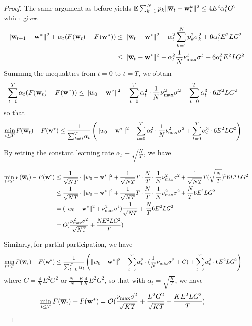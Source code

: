 \begin{proof}
	The same argument as before yields $\mathbb{E}\sum_{k=1}^{N}p_{k}\|{\overline{\mathbf{w}}}_{t}-{\mathbf{w}}_{t}^{k}\|^{2}\leq4E^{2}\alpha_{t}^{2}G^{2}$
	which gives 
	\begin{align*}
	\|{\overline{\mathbf{w}}}_{t+1}-{\mathbf{w}}^{\ast}\|^{2}+\alpha_{t}(F({\overline{\mathbf{w}}}_{t})-F({\mathbf{w}}^{\ast})) & \leq\|{\overline{\mathbf{w}}}_{t}-{\mathbf{w}}^{\ast}\|^{2}+\alpha_{t}^{2}\sum_{k=1}^{N}p_{k}^{2}\sigma_{k}^{2}+6\alpha_{t}^{3}E^{2}LG^{2}\\
	& \leq\|{\overline{\mathbf{w}}}_{t}-{\mathbf{w}}^{\ast}\|^{2}+\alpha_{t}^{2}\frac{1}{N}\nu_{\max}^{2}\sigma^{2}+6\alpha_{t}^{3}E^{2}LG^{2}
	\end{align*}
	Summing the inequalities from $t=0$ to $t=T$, we obtain 
	\begin{align*}
	\sum_{t=0}^{T}\alpha_{t}(F({\overline{\mathbf{w}}}_{t})-F({\mathbf{w}}^{\ast})) & \leq\|w_{0}-{\mathbf{w}}^{\ast}\|^{2}+\sum_{t=0}^{T}\alpha_{t}^{2}\cdot\frac{1}{N}\nu_{\max}^{2}\sigma^{2}+\sum_{t=0}^{T}\alpha_{t}^{3}\cdot6E^{2}LG^{2}
	\end{align*}
	so that
	\begin{align*}
	\min_{t\leq T}F({\overline{\mathbf{w}}}_{t})-F({\mathbf{w}}^{\ast}) & \leq\frac{1}{\sum_{t=0}^{T}\alpha_{t}}\left(\|w_{0}-{\mathbf{w}}^{\ast}\|^{2}+\sum_{t=0}^{T}\alpha_{t}^{2}\cdot\frac{1}{N}\nu_{\max}^{2}\sigma^{2}+\sum_{t=0}^{T}\alpha_{t}^{3}\cdot6E^{2}LG^{2}\right)
	\end{align*}
	
	By setting the constant learning rate $\alpha_{t}\equiv\sqrt{\frac{N}{T}}$,
	we have 
	
\begin{align*}
\min_{t\leq T}F({\overline{\mathbf{w}}}_{t})-F({\mathbf{w}}^{\ast}) & \leq\frac{1}{\sqrt{NT}}\cdot\|w_{0}-{\mathbf{w}}^{\ast}\|^{2}+\frac{1}{\sqrt{NT}}T\cdot\frac{N}{T}\cdot\frac{1}{N}\nu_{\max}^{2}\sigma^{2}+\frac{1}{\sqrt{NT}}T(\sqrt{\frac{N}{T}})^{3}6E^{2}LG^{2}\\
& \leq\frac{1}{\sqrt{NT}}\cdot\|w_{0}-{\mathbf{w}}^{\ast}\|^{2}+\frac{1}{\sqrt{NT}}T\cdot\frac{N}{T}\cdot\frac{1}{N}\nu_{\max}^{2}\sigma^{2}+\frac{N}{T}6E^{2}LG^{2}\\
& =(\|w_{0}-{\mathbf{w}}^{\ast}\|^{2}+\nu_{\max}^{2}\sigma^{2})\frac{1}{\sqrt{NT}}+\frac{N}{T}6E^{2}LG^{2}\\
& =O(\frac{\nu_{\max}^{2}\sigma^{2}}{\sqrt{NT}}+\frac{NE^{2}LG^{2}}{T})
\end{align*}
	
	Similarly, for partial participation, we have 
	\begin{align*}
	\min_{t\leq T}F({\overline{\mathbf{w}}}_{t})-F({\mathbf{w}}^{\ast}) & \leq\frac{1}{\sum_{t=0}^{T}\alpha_{t}}\left(\|w_{0}-{\mathbf{w}}^{\ast}\|^{2}+\sum_{t=0}^{T}\alpha_{t}^{2}\cdot(\frac{1}{N}\nu_{\max}\sigma^{2}+C)+\sum_{t=0}^{T}\alpha_{t}^{3}\cdot6E^{2}LG^{2}\right)
	\end{align*}
	where $C=\frac{4}{K}E^{2}G^{2}$ or $\frac{N-K}{N-1}\frac{4}{K}E^{2}G^{2}$,
	so that with $\alpha_{t}=\sqrt{\frac{K}{T}}$, we have 
	\begin{align*}
	\min_{t\leq T}F({\overline{\mathbf{w}}}_{t})-F({\mathbf{w}}^{\ast}) & =\mathcal{O}(\frac{\nu_{\max}\sigma^{2}}{\sqrt{KT}}+\frac{E^{2}G^{2}}{\sqrt{KT}}+\frac{KE^{2}LG^{2}}{T})
	\end{align*}
\end{proof}